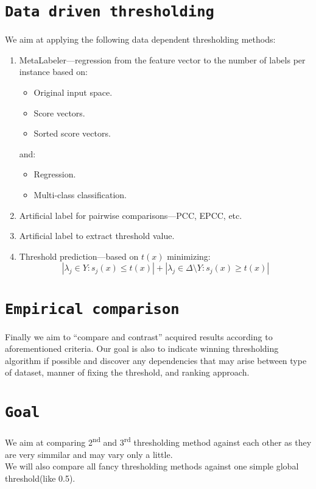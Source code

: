 \documentclass[12pt,a4paper,twocolumn]{article}
\newcommand{\ts}{\textsuperscript}
\begin{document}
\section*{\texttt{Data driven thresholding}}
We aim at applying the following data dependent thresholding methods:
\begin{enumerate}
\item MetaLabeler---regression from the feature vector to the number of labels per instance based on:
	\begin{itemize} %
	\item Original input space.
	\item Score vectors.
	\item Sorted score vectors.
	\end{itemize}
	and:
	\begin{itemize} %
	\item Regression.
	\item Multi-class classification.
	\end{itemize}

\item Artificial label for pairwise comparisons---PCC, EPCC, etc.
\item Artificial label to extract threshold value.
\item Threshold prediction---based on $t(x)$ minimizing:
	$$
	| \lambda_j \in Y : s_j(x) \leq t(x) | + | \lambda_j \in \Delta \text{\textbackslash{}} Y : s_j(x) \geq t(x) |
	$$
\end{enumerate}

\section*{\texttt{Empirical comparison}}
Finally we aim to ``compare and contrast'' acquired results according to aforementioned criteria. Our goal is also to indicate winning thresholding algorithm if possible and discover any dependencies that may arise between type of dataset, manner of fixing the threshold, and ranking approach.

\section*{\texttt{Goal}}
We aim at comparing 2\ts{nd} and 3\ts{rd} thresholding method against each other as they are very simmilar and may vary only a little.\\
We will also compare all fancy thresholding methods against one simple global threshold(like 0.5).\\


\end{document}
